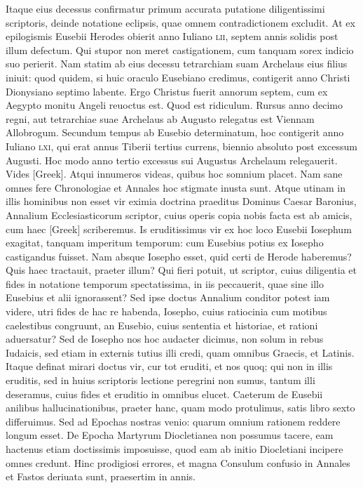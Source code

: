 Itaque eius decessus confirmatur primum accurata putatione
diligentissimi scriptoris, deinde notatione eclipsis, quae omnem contradictionem
excludit.
At ex epilogismis Eusebii Herodes obierit
anno Iuliano \textsc{lii}, septem annis solidis post illum defectum.
Qui stupor non meret castigationem, cum tanquam sorex indicio suo perierit.
Nam statim ab eius decessu tetrarchiam suam Archelaus eius filius
iniuit: quod quidem, si huic oraculo Eusebiano credimus, contigerit
anno Christi Dionysiano septimo labente.
Ergo Christus fuerit
annorum septem, cum ex Aegypto monitu Angeli reuoctus est.
Quod est ridiculum.
Rursus anno decimo regni, aut tetrarchiae suae
Archelaus ab Augusto relegatus est Viennam Allobrogum.
Secundum tempus ab Eusebio determinatum, hoc contigerit anno Iuliano
\textsc{lxi}, qui erat annus Tiberii tertius currens, biennio absoluto
post excessum Augusti.
Hoc modo anno tertio excessus sui Augustus
Archelaum relegauerit.
Vides \textgreek{[Greek]}.
Atqui innumeros videas,
quibus hoc somnium placet.
Nam sane omnes fere Chronologiae
et Annales hoc stigmate inusta sunt.
Atque utinam in illis hominibus
non esset vir eximia doctrina praeditus Dominus Caesar Baronius,
Annalium Ecclesiasticorum scriptor, cuius operis copia nobis
facta est ab amicis, cum haec \textgreek{[Greek]} scriberemus.
Is eruditissimus
vir ex hoc loco Eusebii Iosephum exagitat, tanquam imperitum
temporum: cum Eusebius potius ex Iosepho castigandus fuisset.
Nam absque Iosepho esset, quid certi de Herode haberemus?
Quis haec tractauit, praeter illum?
Qui fieri potuit, ut scriptor, cuius diligentia
et fides in notatione temporum spectatissima, in iis peccauerit,
quae sine illo Eusebius et alii ignorassent?
Sed ipse doctus Annalium
conditor potest iam videre, utri fides de hac re habenda, Iosepho,
cuius ratiocinia cum motibus caelestibus congruunt, an Eusebio,
cuius sententia et historiae, et rationi aduersatur?
Sed de Iosepho
nos hoc audacter dicimus, non solum in rebus Iudaicis, sed etiam
in externis tutius illi credi, quam omnibus Graecis, et Latinis.
Itaque
definat mirari doctus vir, cur tot eruditi, et nos quoq; qui non in illis
eruditis, sed in huius scriptoris lectione peregrini non sumus, tantum
illi deseramus, cuius fides et eruditio in omnibus elucet.
Caeterum de Eusebii anilibus hallucinationibus, praeter hanc, quam
modo protulimus, satis libro sexto differuimus.
Sed ad Epochas
nostras venio: quarum omnium rationem reddere longum esset.
De Epocha Martyrum Diocletianea non possumus tacere, eam hactenus
etiam doctissimis imposuisse, quod eam ab initio Diocletiani
incipere omnes credunt.
Hinc prodigiosi errores, et magna Consulum
confusio in Annales et Fastos deriuata sunt, praesertim in annis.
{}

